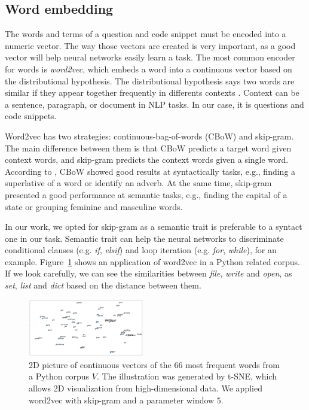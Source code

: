 \documentclass[sigconf]{acmart}
\begin{document}
\subsection{Word embedding}
\label{sec:word-embedding}

The words and terms of a question and code snippet must be encoded into a numeric vector. The way those vectors are created is very important, as a good vector will help neural networks easily learn a task. The most common encoder for words is \emph{word2vec}, which embeds a word into a continuous vector based on the distributional hypothesis. The distributional hypothesis says two words are similar if they appear together frequently in differents contexts \citep{Goodfellow-et-al-2016}. Context can be a sentence, paragraph, or document in NLP tasks. In our case, it is questions and code snippets.

Word2vec has two strategies: continuous-bag-of-words (CBoW) and skip-gram. The main difference between them is that CBoW predicts a target word given context words, and skip-gram predicts the context words given a single word. According to \cite{mikolov2013distributed}, CBoW showed good results at syntactically tasks, e.g., finding a superlative of a word or identify an adverb. At the same time, skip-gram presented a good performance at semantic tasks, e.g., finding the capital of a state or grouping feminine and masculine words. 

In our work, we opted for skip-gram as a semantic trait is preferable to a syntact one in our task. Semantic trait can help the neural networks to discriminate conditional clauses (e.g. \emph{if}, \emph{elsif}) and loop iteration (e.g. \emph{for}, \emph{while}), for an example. Figure~\ref{fig:tsne-code-snippet-python} shows an application of word2vec in a Python related corpus. If we look carefully, we can see the similarities between \emph{file}, \emph{write} and \emph{open}, as \emph{set}, \emph{list} and \emph{dict} based on the distance between them.

\begin{figure}[H]
\includegraphics[width=0.45\textwidth]{figuras/code_tsne.png}
\caption{2D picture of continuous vectors of the 66 most frequent words from a Python corpus $V$. The illustration was generated by t-SNE, which allows 2D visualization from high-dimensional data. We applied word2vec with skip-gram and a parameter window $5$.}

\label{fig:tsne-code-snippet-python}
\end{figure}
\end{document}
